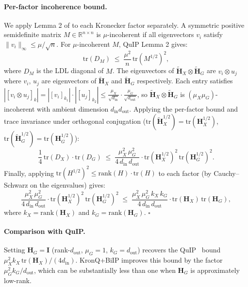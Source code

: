 \documentclass{article} %
\begin{document}
\paragraph{Per-factor incoherence bound.}
We apply Lemma 2 of \citet{chee2023quip} to each Kronecker factor separately. A symmetric positive semidefinite matrix $M \in \mathbb{R}^{n\times n}$ is
$\mu$-incoherent if all eigenvectors $v_i$ satisfy $\|v_i\|_\infty \leq \mu/\sqrt{n}$. For $\mu$-incoherent $M$, QuIP Lemma 2 gives:
\begin{equation}
    \mathrm{tr}(D_M) \;\leq\; \frac{\mu^2}{n}\,\mathrm{tr}(M^{1/2})^2,
\end{equation}
where $D_M$ is the LDL diagonal of $M$.
The eigenvectors of $\widetilde{\mathbf{H}}_X \otimes \widetilde{\mathbf{H}}_G$ are $v_i \otimes u_j$ where $v_i$, $u_j$ are eigenvectors of $\widetilde{\mathbf{H}}_X$ and $\widetilde{\mathbf{H}}_G$ respectively. Each entry satisfies $|[v_i \otimes u_j]_k| = |[v_i]_{k_1}|\cdot|[u_j]_{k_2}| \leq \frac{\mu_X}{\sqrt{d_{\mathrm{in}}}}\cdot\frac{\mu_G}{\sqrt{d_{\mathrm{out}}}}$, so $\widetilde{\mathbf{H}}_X \otimes \widetilde{\mathbf{H}}_G$ is $(\mu_X\mu_G)$-incoherent with ambient dimension $d_{\mathrm{in}} d_{\mathrm{out}}$. Applying the per-factor bound and trace invariance under orthogonal conjugation ($\mathrm{tr}(\widetilde{\mathbf{H}}_X^{1/2}) = \mathrm{tr}(\mathbf{H}_X^{1/2})$, $\mathrm{tr}(\widetilde{\mathbf{H}}_G^{1/2}) = \mathrm{tr}(\mathbf{H}_G^{1/2})$):
\begin{equation}
    \frac{1}{4}\,\mathrm{tr}(D_X)\cdot\mathrm{tr}(D_G)
    \;\leq\;
    \frac{\mu_X^2\,\mu_G^2}{4\,d_{\mathrm{in}}\,d_{\mathrm{out}}}
    \cdot\mathrm{tr}(\mathbf{H}_X^{1/2})^2\,\mathrm{tr}(\mathbf{H}_G^{1/2})^2.
\end{equation}
Finally, applying $\mathrm{tr}(H^{1/2})^2 \leq \mathrm{rank}(H)\cdot\mathrm{tr}(H)$ to each factor (by Cauchy--Schwarz on the eigenvalues) gives:
\begin{equation}
    \frac{\mu_X^2\,\mu_G^2}{4\,d_{\mathrm{in}}\,d_{\mathrm{out}}}
    \cdot\mathrm{tr}(\mathbf{H}_X^{1/2})^2\,\mathrm{tr}(\mathbf{H}_G^{1/2})^2
    \;\leq\;
    \frac{\mu_X^2\,\mu_G^2\,k_X\,k_G}{4\,d_{\mathrm{in}}\,d_{\mathrm{out}}}
    \cdot\mathrm{tr}(\mathbf{H}_X)\,\mathrm{tr}(\mathbf{H}_G),
\end{equation}
where $k_X = \mathrm{rank}(\mathbf{H}_X)$ and $k_G = \mathrm{rank}(\mathbf{H}_G)$. \hfill$\square$

\paragraph{Comparison with QuIP.}
Setting $\mathbf{H}_G = \mathbf{I}$ (rank-$d_{\mathrm{out}}$, $\mu_G = 1$, $k_G = d_{\mathrm{out}}$) recovers the QuIP~\citep{chee2023quip} bound $\mu_X^2 k_X\,\mathrm{tr}(\mathbf{H}_X) / (4 d_{\mathrm{in}})$. KronQ+BiIP improves this bound by the factor $\mu_G^2 k_G / d_{\mathrm{out}}$, which can be substantially less than one when $\mathbf{H}_G$ is approximately low-rank.
\end{document}
